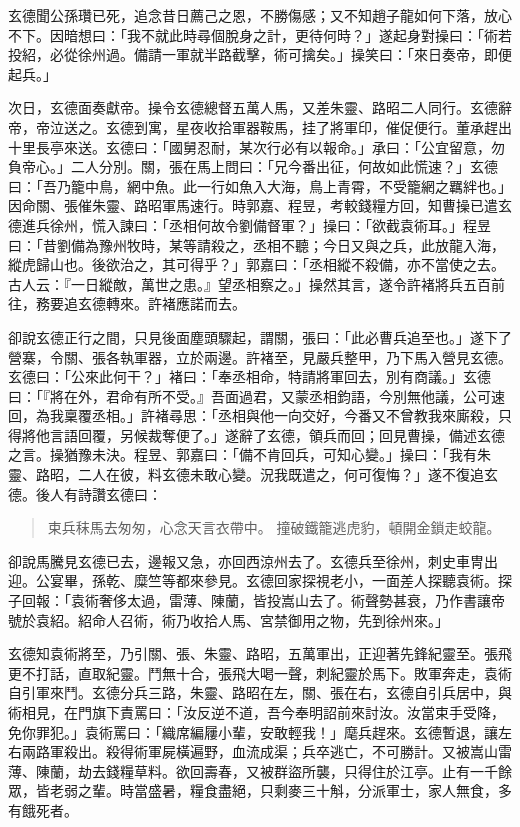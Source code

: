 玄德聞公孫瓚已死，追念昔日薦己之恩，不勝傷感；又不知趙子龍如何下落，放心不下。因暗想曰：「我不就此時尋個脫身之計，更待何時？」遂起身對操曰：「術若投紹，必從徐州過。備請一軍就半路截擊，術可擒矣。」操笑曰：「來日奏帝，即便起兵。」

次日，玄德面奏獻帝。操令玄德總督五萬人馬，又差朱靈、路昭二人同行。玄德辭帝，帝泣送之。玄德到寓，星夜收拾軍器鞍馬，挂了將軍印，催促便行。董承趕出十里長亭來送。玄德曰：「國舅忍耐，某次行必有以報命。」承曰：「公宜留意，勿負帝心。」二人分別。關，張在馬上問曰：「兄今番出征，何故如此慌速？」玄德曰：「吾乃籠中鳥，網中魚。此一行如魚入大海，鳥上青霄，不受籠網之羈絆也。」因命關、張催朱靈、路昭軍馬速行。時郭嘉、程昱，考較錢糧方回，知曹操已遣玄德進兵徐州，慌入諫曰：「丞相何故令劉備督軍？」操曰：「欲截袁術耳。」程昱曰：「昔劉備為豫州牧時，某等請殺之，丞相不聽；今日又與之兵，此放龍入海，縱虎歸山也。後欲治之，其可得乎？」郭嘉曰：「丞相縱不殺備，亦不當使之去。古人云：『一日縱敵，萬世之患。』望丞相察之。」操然其言，遂令許褚將兵五百前往，務要追玄德轉來。許褚應諾而去。

卻說玄德正行之間，只見後面塵頭驟起，謂關，張曰：「此必曹兵追至也。」遂下了營寨，令關、張各執軍器，立於兩邊。許褚至，見嚴兵整甲，乃下馬入營見玄德。玄德曰：「公來此何干？」褚曰：「奉丞相命，特請將軍回去，別有商議。」玄德曰：「『將在外，君命有所不受。』吾面過君，又蒙丞相鈞語，今別無他議，公可速回，為我稟覆丞相。」許褚尋思：「丞相與他一向交好，今番又不曾教我來廝殺，只得將他言語回覆，另候裁奪便了。」遂辭了玄德，領兵而回；回見曹操，備述玄德之言。操猶豫未決。程昱、郭嘉曰：「備不肯回兵，可知心變。」操曰：「我有朱靈、路昭，二人在彼，料玄德未敢心變。況我既遣之，何可復悔？」遂不復追玄德。後人有詩讚玄德曰：

\begin{quote}
束兵秣馬去匆匆，心念天言衣帶中。
撞破鐵籠逃虎豹，頓開金鎖走蛟龍。
\end{quote}

卻說馬騰見玄德已去，邊報又急，亦回西涼州去了。玄德兵至徐州，刺史車冑出迎。公宴畢，孫乾、糜竺等都來參見。玄德回家探視老小，一面差人探聽袁術。探子回報：「袁術奢侈太過，雷薄、陳蘭，皆投嵩山去了。術聲勢甚衰，乃作書讓帝號於袁紹。紹命人召術，術乃收拾人馬、宮禁御用之物，先到徐州來。」

玄德知袁術將至，乃引關、張、朱靈、路昭，五萬軍出，正迎著先鋒紀靈至。張飛更不打話，直取紀靈。鬥無十合，張飛大喝一聲，刺紀靈於馬下。敗軍奔走，袁術自引軍來鬥。玄德分兵三路，朱靈、路昭在左，關、張在右，玄德自引兵居中，與術相見，在門旗下責罵曰：「汝反逆不道，吾今奉明詔前來討汝。汝當束手受降，免你罪犯。」袁術罵曰：「織席編屨小輩，安敢輕我！」麾兵趕來。玄德暫退，讓左右兩路軍殺出。殺得術軍屍橫遍野，血流成渠；兵卒逃亡，不可勝計。又被嵩山雷薄、陳蘭，劫去錢糧草料。欲回壽春，又被群盜所襲，只得住於江亭。止有一千餘眾，皆老弱之輩。時當盛暑，糧食盡絕，只剩麥三十斛，分派軍士，家人無食，多有餓死者。

